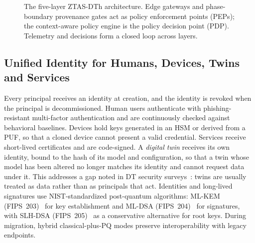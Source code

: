 \documentclass[journal]{IEEEtran}
\newcommand{\ztas}{ZTAS-DTh}
\begin{document}
\begin{figure}[!t]
\caption{The five-layer \ztas{} architecture. Edge gateways and phase-boundary provenance gates act as policy enforcement points (PEPs); the context-aware policy engine is the policy decision point (PDP). Telemetry and decisions form a closed loop across layers.}
\label{fig:arch}
\end{figure}

\subsection{Unified Identity for Humans, Devices, Twins and Services}
\label{sec:arch-id}
Every principal receives an identity at creation, and the identity is revoked when the principal is decommissioned. Human users authenticate with phishing-resistant multi-factor authentication and are continuously checked against behavioral baselines. Devices hold keys generated in an HSM or derived from a PUF, so that a cloned device cannot present a valid credential. Services receive short-lived certificates and are code-signed. A \emph{digital twin} receives its own identity, bound to the hash of its model and configuration, so that a twin whose model has been altered no longer matches its identity and cannot request data under it. This addresses a gap noted in DT security surveys~\cite{alcaraz2022dt,mun2025survey}: twins are usually treated as data rather than as principals that act. Identities and long-lived signatures use NIST-standardized post-quantum algorithms: ML-KEM (FIPS~203)~\cite{fips203} for key establishment and ML-DSA (FIPS~204)~\cite{fips204} for signatures, with SLH-DSA (FIPS~205)~\cite{fips205} as a conservative alternative for root keys. During migration, hybrid classical-plus-PQ modes preserve interoperability with legacy endpoints.
\end{document}
